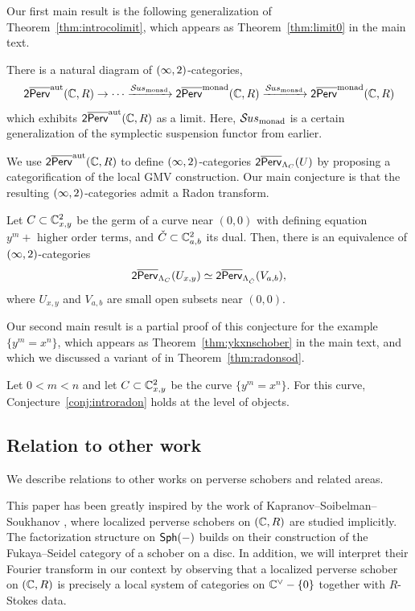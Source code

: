 Our first main result is the following generalization of Theorem~\ref{thm:introcolimit}, which appears as Theorem~\ref{thm:limit0} in the main text.
\begin{thm}\label{thm:introcolimit2}
    There is a natural diagram of $(\infty,2)$-categories,
    \[\mathsf{2}\overline{\mathsf{Perv}}^{\operatorname{aut}}(\mathbb{C},R)\to \cdots\xrightarrow{\mathcal{S}\kern -.5pt us_{\operatorname{monad}}}\mathsf{2}\overline{\mathsf{Perv}}^{\operatorname{monad}}(\mathbb{C},R)\xrightarrow{\mathcal{S}\kern -.5pt us_{\operatorname{monad}}}\mathsf{2}\overline{\mathsf{Perv}}^{\operatorname{monad}}(\mathbb{C},R)\]
    which exhibits $\mathsf{2}\overline{\mathsf{Perv}}^{\operatorname{aut}}(\mathbb{C},R)$ as a limit. Here, $\mathcal{S}\kern -.5pt us_{\operatorname{monad}}$ is a certain generalization of the symplectic suspension functor from earlier.
\end{thm}

We use ${\mathsf{2}\overline{\mathsf{Perv}}}^{\operatorname{aut}}(\mathbb{C},R)$ to define $(\infty,2)$-categories $\mathsf{2}\overline{\mathsf{Perv}}_{\Lambda_C}(U)$ by proposing a categorification of the local GMV construction. Our main conjecture is that the resulting $(\infty,2)$-categories admit a Radon transform.

\begin{conj}\label{conj:introradon}
    Let $C\subset \mathbb{C}^2_{x,y}$ be the germ of a curve near $(0,0)$ with defining equation $y^m + \text{ higher order terms}$, and $\check{C}\subset \mathbb{C}^2_{a,b}$ its dual. Then, there is an equivalence of $(\infty,2)$-categories
    \[\mathsf{2}\overline{\mathsf{Perv}}_{\Lambda_C}(U_{x,y})\simeq \mathsf{2}\overline{\mathsf{Perv}}_{\Lambda_{\check{C}}}(V_{a,b}),\]
    where $U_{x,y}$ and $V_{a,b}$ are small open subsets near $(0,0)$.
\end{conj}

Our second main result is a partial proof of this conjecture for the example $\{y^m=x^n\}$, which appears as Theorem~\ref{thm:ykxnschober} in the main text, and which we discussed a variant of in Theorem~\ref{thm:radonsod}.
\begin{thm}\label{thm:introykxn}
    Let $0<m<n$ and let $C\subset\mathbb{C}^2_{x,y}$ be the curve $\{y^m=x^n\}$. For this curve, Conjecture~\ref{conj:introradon} holds at the level of objects.
\end{thm}

\subsection{Relation to other work}
We describe relations to other works on perverse schobers and related areas.

This paper has been greatly inspired by the work of Kapranov--Soibelman--Soukhanov \cite{kapranovPerverseSchobersAlgebra2020}, where localized perverse schobers on $(\mathbb{C},R)$ are studied implicitly. The factorization structure on $\mathsf{Sph}(-)$ builds on their construction of the Fukaya--Seidel category of a schober on a disc. In addition, we will interpret their Fourier transform in our context by observing that a localized perverse schober on $(\mathbb{C},R)$ is precisely a local system of categories on $\mathbb{C}^{\vee}-\{0\}$ together with $R$-Stokes data.

